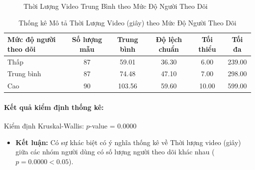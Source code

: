 \begin{figure}[H]
    \centering
    \caption{Thời Lượng Video Trung Bình theo Mức Độ Người Theo Dõi}
    \label{fig:thoi_luong_trung_binh}
\end{figure}

\begin{table}[H]
    \centering
    \begin{tabular}{lccccc}
        \toprule
        Mức độ người theo dõi & Số lượng mẫu & Trung bình & Độ lệch chuẩn & Tối thiểu & Tối đa \\
        \midrule
        Thấp & 87 & 59.01 & 36.30 & 6.00 & 239.00 \\
        Trung bình & 87 & 74.48 & 47.10 & 7.00 & 298.00 \\
        Cao & 90 & 103.56 & 59.60 & 10.00 & 599.00 \\
        \bottomrule
    \end{tabular}
    \caption{Thống kê Mô tả Thời Lượng Video (giây) theo Mức Độ Người Theo Dõi}
    \label{tab:thoi_luong_thong_ke}
\end{table}

\paragraph{Kết quả kiểm định thống kê:}
Kiểm định Kruskal-Wallis: $p$-value = 0.0000
\begin{itemize}
    \item \textbf{Kết luận:} Có sự khác biệt có ý nghĩa thống kê về Thời lượng video (giây) giữa các nhóm người dùng có số lượng người theo dõi khác nhau ($p = 0.0000 < 0.05$).
\end{itemize}


